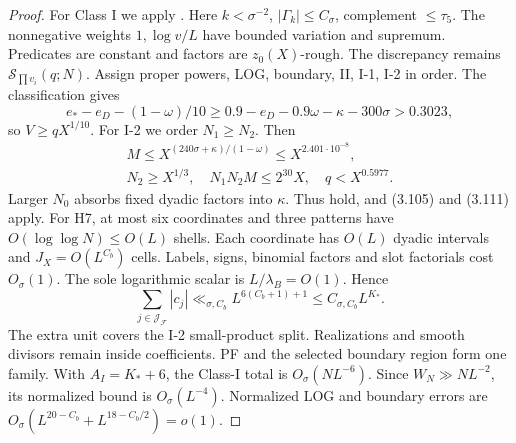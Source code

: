 \begin{proof}
For Class I we apply \cite[Lemmas~3.3 and~3.5, \S3.11, (B.30)]{Z1}.
Here $k<\sigma^{-2}$, $|\Gamma_k|\le C_\sigma$, complement $\le\tau_5$.
The nonnegative weights $1,\log v/L$ have bounded variation and supremum.
Predicates are constant and factors are $z_0(X)$-rough.
The discrepancy remains $\mathcal S_{\prod v_i}(q;N)$.
Assign proper powers, LOG, boundary, II, I-1, I-2 in order.
The classification gives
\[
 e_*-e_D-(1-\omega)/10\ge0.9-e_D-0.9\omega-\kappa-300\sigma>0.3023,
\]
so $V\ge qX^{1/10}$.
For I-2 we order $N_1\ge N_2$. Then
\[
 \begin{gathered}
 M\le X^{(240\sigma+\kappa)/(1-\omega)}\le X^{2.401\cdot10^{-8}},\\
 N_2\ge X^{1/3},\quad N_1N_2M\le2^{30}X,\quad q<X^{0.5977}.
\end{gathered}
\]
Larger $N_0$ absorbs fixed dyadic factors into $\kappa$.
Thus \cite[(3.100)--(3.101)]{Z1} hold, and (3.105) and (3.111) apply.
For H7, at most six coordinates and three patterns have
$O(\log\log N)\le O(L)$ shells.
Each coordinate has $O(L)$ dyadic intervals and $J_X=O(L^{C_b})$ cells.
Labels, signs, binomial factors and slot factorials cost $O_\sigma(1)$.
The sole logarithmic scalar is $L/\lambda_B=O(1)$.
Hence
\[
 \sum_{j\in\mathcal J_{\mathscr F}}|c_j|
 \ll_{\sigma,C_b}L^{6(C_b+1)+1}\le C_{\sigma,C_b}L^{K_*}.
\]
The extra unit covers the I-2 small-product split.
Realizations and smooth divisors remain inside coefficients.
PF and the selected boundary region form one family.
With $A_I=K_*+6$, the Class-I total is $O_\sigma(NL^{-6})$.
Since $W_N\gg NL^{-2}$, its normalized bound is $O_\sigma(L^{-4})$.
Normalized LOG and boundary errors are
$O_\sigma(L^{20-C_b}+L^{18-C_b/2})=o(1)$.
\end{proof}


